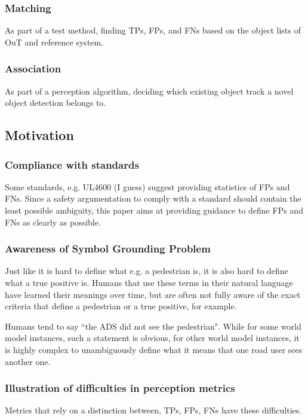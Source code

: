 \documentclass[conference]{IEEEtran}
\begin{document}
\subsubsection{Matching} As part of a test method, finding TPs, FPs, and FNs based on the object lists of OuT and reference system. 

\subsubsection{Association} As part of a perception algorithm, deciding which existing object track a novel object detection belongs to. 

\subsection{Motivation}

\subsubsection{Compliance with standards}
Some standards, e.g. UL4600 (I guess) \cite{UL4600_voting_2019} suggest providing statistics of FPs and FNs. 
Since a safety argumentation to comply with a standard should contain the least possible ambiguity, this paper aims at providing guidance to define FPs and FNs as clearly as possible. 

\subsubsection{Awareness of Symbol Grounding Problem}
Just like it is hard to define what e.g. a pedestrian is, it is also hard to define what a true positive is. 
Humans that use these terms in their natural language have learned their meanings over time, but are often not fully aware of the exact criteria that define a pedestrian or a true positive, for example.  

Humans tend to say ``the ADS did not see the pedestrian". While for some world model instances, such a statement is obvious, for other world model instances, it is highly complex to unambiguously define what it means that one road user sees another one. 

\subsubsection{Illustration of difficulties in perception metrics}

Metrics that rely on a distinction between, TPs, FPs, FNs have these difficulties. 
\end{document}
